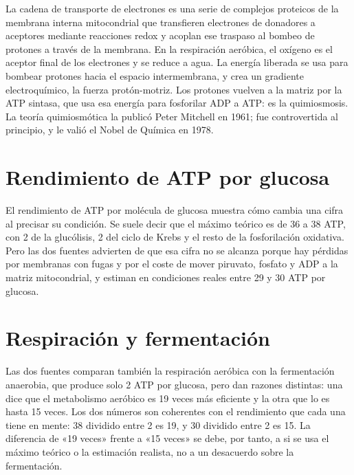 \documentclass{book}
\begin{document}
La cadena de transporte de electrones es una serie de complejos proteicos de la membrana interna mitocondrial que transfieren electrones de donadores a aceptores mediante reacciones redox y acoplan ese traspaso al bombeo de protones a través de la membrana. En la respiración aeróbica, el oxígeno es el aceptor final de los electrones y se reduce a agua. La energía liberada se usa para bombear protones hacia el espacio intermembrana, y crea un gradiente electroquímico, la fuerza protón-motriz. Los protones vuelven a la matriz por la ATP sintasa, que usa esa energía para fosforilar ADP a ATP: es la quimiosmosis. La teoría quimiosmótica la publicó Peter Mitchell en 1961; fue controvertida al principio, y le valió el Nobel de Química en 1978.


\section{Rendimiento de ATP por glucosa}

El rendimiento de ATP por molécula de glucosa muestra cómo cambia una cifra al precisar su condición. Se suele decir que el máximo teórico es de 36 a 38 ATP, con 2 de la glucólisis, 2 del ciclo de Krebs y el resto de la fosforilación oxidativa. Pero las dos fuentes advierten de que esa cifra no se alcanza porque hay pérdidas por membranas con fugas y por el coste de mover piruvato, fosfato y ADP a la matriz mitocondrial, y estiman en condiciones reales entre 29 y 30 ATP por glucosa.


\section{Respiración y fermentación}

Las dos fuentes comparan también la respiración aeróbica con la fermentación anaerobia, que produce solo 2 ATP por glucosa, pero dan razones distintas: una dice que el metabolismo aeróbico es 19 veces más eficiente y la otra que lo es hasta 15 veces. Los dos números son coherentes con el rendimiento que cada una tiene en mente: 38 dividido entre 2 es 19, y 30 dividido entre 2 es 15. La diferencia de «19 veces» frente a «15 veces» se debe, por tanto, a si se usa el máximo teórico o la estimación realista, no a un desacuerdo sobre la fermentación.
\end{document}
